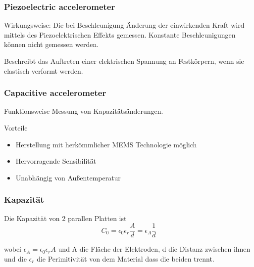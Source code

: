 \documentclass[10pt,a4paper,oneside]{beamer}
\begin{document}
\begin{frame}
  \frametitle{Piezoelectric accelerometer}
  Wirkungsweise: Die bei Beschleunigung Änderung der einwirkenden Kraft wird mittels des Piezoelektrischen Effekts gemessen.
  Konstante Beschleunigungen können nicht gemessen werden.
    \bigskip
    \begin{definition}[Piezoelektrizität]
		Beschreibt das Auftreten einer elektrischen Spannung an Festkörpern, wenn sie elastisch verformt werden.
	\end{definition}
\end{frame}

\begin{frame}
	\frametitle{Capacitive accelerometer}
	\begin{block}{Funktionsweise}
		Messung von Kapazitätsänderungen.
	\end{block}

    \bigskip
   
	Vorteile
 	\begin{itemize}
 		\item Herstellung mit herkömmlicher MEMS Technologie möglich
 		\item Hervorragende Sensibilität
		\item Unabhängig von Außentemperatur
 	\end{itemize}
\end{frame}

\begin{frame}
	\frametitle{Kapazität}
	Die Kapazität von 2 parallen Platten ist \cite{AM08}
	\begin{equation}
		C_{0} = \epsilon_{0} \epsilon_{r} \frac{A}{d} = \epsilon_{A} \frac{1}{d}
	\end{equation}
	
	wobei $\epsilon_{A} = \epsilon_{0} \epsilon_{r} A$ und A die Fläche der Elektroden, d die Distanz zwischen ihnen und die $\epsilon_{r}$ die Perimitivität von dem Material dass die beiden trennt.

\end{frame}
\end{document}
